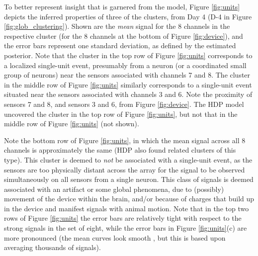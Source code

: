 \documentclass[journal]{IEEEtran}
\begin{document}
To better represent insight that is garnered from the model,  Figure \ref{fig:units} {depicts } the inferred properties of three of the clusters, from Day 4 (D-4 in Figure \ref{fig:glob_clustering}). Shown are the \emph{mean} signal for the 8 channels in the respective cluster (for the 8 channels at the bottom of Figure \ref{fig:device}), and the error bars represent one standard deviation, as defined by the estimated posterior. Note that the cluster in {the top row of } Figure \ref{fig:units} corresponds to a localized single-unit event, presumably from a neuron (or a coordinated small group of neurons) near the sensors associated with channels 7 and 8. The cluster in {the middle row of } Figure \ref{fig:units} similarly corresponds to a single-unit event situated near the sensors associated with channels 3 and 6. Note the proximity of sensors 7 and 8, and sensors 3 and 6, from Figure \ref{fig:device}. The HDP model uncovered the cluster in {the top row of } Figure \ref{fig:units}, but not that in {the middle row of } Figure \ref{fig:units} {(not shown)}.

Note {the bottom row of} Figure \ref{fig:units}, in which the mean signal across all 8 channels is approximately the same (HDP also found related clusters of this type). This cluster is deemed to \emph{not} be associated with a single-unit event, as the sensors are too physically distant across the array for the signal to be observed simultaneously on all sensors from a single neuron. This class of signals is deemed associated with an artifact or some global phenomena, due to (possibly) movement of the device within the brain, and/or because of charges that build up in the device and manifest signals with animal motion. Note that in {the top two rows of} Figure \ref{fig:units} the error bars are relatively tight with respect to the strong signals in the set of eight, while the error bars in Figure \ref{fig:units}(c) are more pronounced (the mean curves look {smooth}
, but this is based upon averaging thousands of signals).
\end{document}
